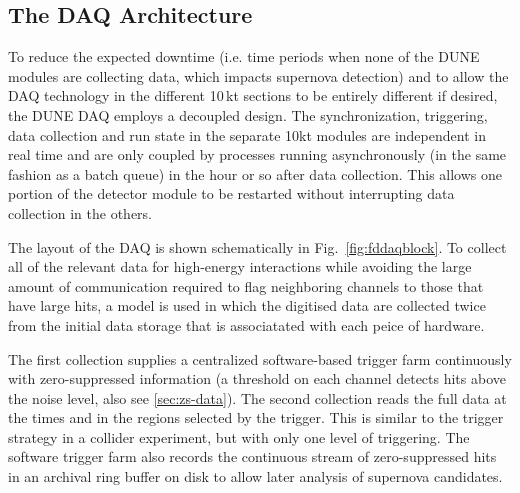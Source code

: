 \subsection{The DAQ Architecture}
\label{sec:daq-architecture}
To reduce the expected downtime (i.e. time periods when none of the DUNE modules are collecting data, which impacts supernova detection)
and to allow the DAQ technology in the different 10\,kt sections to be entirely different if desired, the DUNE DAQ employs a decoupled 
design. The synchronization, triggering, data collection and run state in the separate 10kt modules are independent in real time and
are only coupled by processes running asynchronously (in the same fashion as a batch queue) in the hour or so after data collection.
This allows one portion of the detector module to be restarted without interrupting
data collection in the others.

The layout of the DAQ is shown schematically in Fig.~\ref{fig:fddaqblock}.  To collect all of the relevant data for
high-energy interactions
while avoiding the large amount of communication required to flag neighboring channels to those that have large hits, a model is used
in which the digitised data are collected twice from the initial data
storage that is associatated with each peice of hardware. 


The first collection supplies a centralized software-based trigger farm continuously with
zero-suppressed information (a threshold on each channel detects hits above the noise level, also see \ref{sec:zs-data}).  
The second collection reads the full data at the times and in the regions %
selected by the trigger. This is similar to the trigger strategy in a collider experiment,
but with only one level of triggering. The software trigger farm also
records the continuous stream of zero-suppressed hits in an archival
ring buffer on disk to allow later analysis of supernova candidates.

